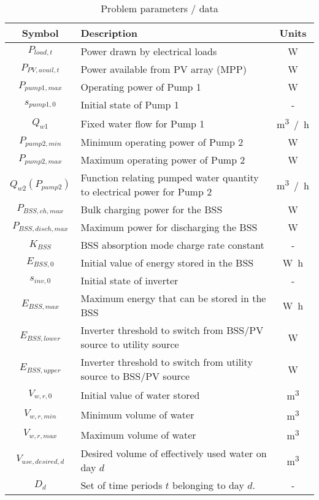 \begin{table}[t]
	\begin{threeparttable}[b]
		\caption{Problem parameters / data}
		\label{table:parameters}
		\begin{tabular}{cp{}c}
			\toprule 
			Symbol & Description & Units \\
			\midrule
			$P_{load,t}$ & Power drawn by electrical loads & \si{W} \\
			$P_{PV,avail,t}$ & Power available from PV array (MPP) & \si{W} \\
			$P_{pump1,max}$ & Operating power of Pump 1 & \si{W} \\
			$s_{pump1,0}$ & Initial state of Pump 1 & - \\
			$Q_{w1}$ & Fixed water flow for Pump 1 & \si{m^3 / h} \\
			$P_{pump2,min}$ & Minimum operating power of Pump 2 & \si{W} \\
			$P_{pump2,max}$ & Maximum operating power of Pump 2 & \si{W} \\
			$Q_{w2}\left(P_{pump2}\right)$ & Function relating pumped water quantity to electrical power for Pump 2 & \si{m^3 / h} \\
			$P_{BSS,ch,max}$ & Bulk charging power for the BSS & \si{W} \\
			$P_{BSS,disch,max}$ & Maximum power for discharging the BSS & \si{W} \\
			$K_{BSS}$ & BSS absorption mode charge rate constant & - \\
			$E_{BSS,0}$ & Initial value of energy stored in the BSS & \si{W h} \\
			$s_{inv,0}$ & Initial state of inverter & - \\
			$E_{BSS,max}$ & Maximum energy that can be stored in the BSS & \si{W h} \\
			$E_{BSS,lower}$ & Inverter threshold to switch from BSS/PV source to utility source & \si{W} \\
			$E_{BSS,upper}$ & Inverter threshold to switch from utility source to BSS/PV source & \si{W} \\
			$V_{w,r,0}$ & Initial value of water stored & \si{m^3} \\
			$V_{w,r,min}$ & Minimum volume of water & \si{m^3} \\
			$V_{w,r,max}$ & Maximum volume of water & \si{m^3} \\
			$V_{use,desired,d}$ & Desired volume of effectively used water on day $d$& \si{m^3} \\
			$D_d$ & Set of time periods $t$ belonging to day $d$. & - \\

\end{tabular}
\end{threeparttable}
\end{table}
